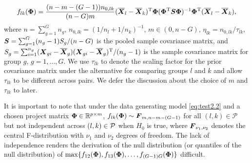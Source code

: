 \documentclass[pdflatex,sn-basic]{sn-jnl}%
\def\calP{{\cal P}}
\def\trans{^{\rm T}}
\newcommand{\uF}       {\mbox{\boldmath$F$}}
\newcommand{\uS}       {\mbox{\boldmath$S$}}
\newcommand{\uX}       {\mbox{\boldmath$X$}}
\newcommand{\uPhi}              {\mbox{\boldmath$\Phi$}}
\theoremstyle{thmstyleone}%
\theoremstyle{thmstyletwo}%
\theoremstyle{thmstylethree}%
\begin{document}
\[
f_{lk}(\uPhi) = \frac{(n-m-(G-1)) n_{0,lk} }{(n-G)m}(\overline{\uX}_l - \overline{\uX}_k)\trans\uPhi(\uPhi\trans\uS\uPhi)^{-1}\uPhi\trans(\overline{\uX}_l - \overline{\uX}_k),
\]where $n = \sum^{G}_{g=1}n_g$, $n_{0,lk} = (1/n_l + 1/n_k)^{-1}$, $m \in (0,  n - G)$, $\eta_{lk} = n_{0,lk}/\tau_{lk}$,
$\uS = \sum^{G}_{g=1} (n_g - 1) S_{g}/(n - G)$ is the pooled sample covariance matrix, and $S_{g} = \sum^{n_g}_{i=1} (\uX_{gi} - \overline{\uX}_{g}) (\uX_{gi} - \overline{\uX}_{g})\trans / (n_g -1)$ is the sample covariance matrix for group $g$, $g = 1,\ldots,G$.
 We use $\tau_{lk}$ to denote the scaling factor for the prior covariance matrix under the alternative for comparing groups $l$ and $k$ and allow $\tau_{lk}$ to be different across pairs. We defer the discussion about the choice of $m$ and $\tau_{lk}$ to later. 

It is important to note that under the data generating model \eqref{eq:test2.2} and a chosen project matrix $\uPhi \in \mathbb{R}^{p \times m}$, $f_{lk}(\uPhi) \sim\uF_{m, n - m- (G-1)}$ for all $(l,k) \in \mathcal{P}$ but not independent across $(l, k)\in\calP$ when $H_{0}$ is true, where $\uF_{\nu_1, \nu_2}$ denotes the central F-distribution with $\nu_1$ and $\nu_2$ degrees of freedom. The lack of independence renders the derivation of the null distribution (or quantiles of the null distribution) of $\max\{f_{12}(\uPhi), f_{13}(\uPhi), \ldots, f_{(G-1)G}(\uPhi) \}$ difficult. %
\end{document}
